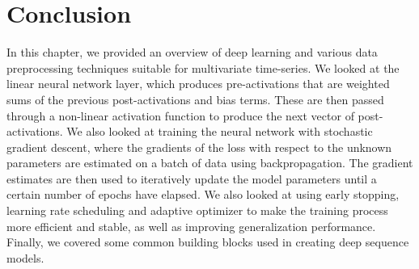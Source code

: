 \documentclass{statsmsc}
\begin{document}
{%





\section{Conclusion}%
\label{sec:Conclusion}%

In this chapter, we provided an overview of deep learning and various data preprocessing techniques
suitable for multivariate time-series. We looked at the linear neural network layer, which
produces pre-activations that are weighted sums of the previous post-activations and bias terms.
These are then passed through a non-linear activation function to produce the next vector of
post-activations. We also looked at training the neural network with stochastic gradient descent,
where the gradients of the loss with respect to the unknown parameters are estimated on a batch of
data using backpropagation. The gradient estimates are then used to iteratively update the model
parameters until a certain number of epochs have elapsed. We also looked at using early stopping,
learning rate scheduling and adaptive optimizer to make the training process more efficient and
stable, as well as improving generalization performance. Finally, we covered some common building
blocks used in creating deep sequence models.

}
\end{document}

